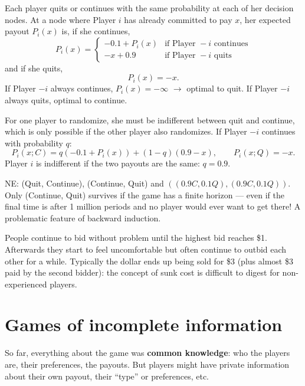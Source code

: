 \documentclass[11pt,a4paper,openany]{book}
\begin{document}
\begin{propbox}[title=Stationary strategies]
Each player quits or continues with the same probability at each of her decision nodes. At a
node where Player $i$ has already committed to pay $x$, her expected payout $P_i(x)$ is,
if she continues,
\[
P_i(x) =
\begin{cases}
-0.1 + P_i(x) & \text{if Player } -i \text{ continues} \\
-x + 0.9 & \text{if Player } -i \text{ quits}
\end{cases}
\]
and if she quits,
\[
P_i(x) = -x.
\]
If Player $-i$ always continues, $P_i(x) = -\infty$ $\rightarrow$ optimal to quit. If Player
$-i$ always quits, optimal to continue.
\end{propbox}


\begin{propbox}[title=Mixed strategies]
For one player to randomize, she must be indifferent between quit and continue, which is only
possible if the other player also randomizes. If Player $-i$ continues with probability $q$:
\[
P_i(x; C) = q(-0.1 + P_i(x)) + (1-q)(0.9 - x), \qquad P_i(x; Q) = -x.
\]
Player $i$ is indifferent if the two payouts are the same: $q = 0.9$.
\end{propbox}

\begin{keybox}[title={Three NE, one survives the finite horizon}]
NE: (Quit, Continue), (Continue, Quit) and $((0.9C, 0.1Q), (0.9C, 0.1Q))$. Only
(Continue, Quit) survives if the game has a finite horizon --- even if the final time is after
1 million periods and no player would ever want to get there! A problematic feature of
backward induction.
\end{keybox}

\begin{exbox}[title=In the lab]
People continue to bid without problem until the highest bid reaches \$1. Afterwards they
start to feel uncomfortable but often continue to outbid each other for a while. Typically
the dollar ends up being sold for \$3 (plus almost \$3 paid by the second bidder): the concept
of sunk cost is difficult to digest for non-experienced players.
\end{exbox}


\section{Games of incomplete information}

\begin{rembox}[title=Beyond common knowledge]
So far, everything about the game was \textbf{common knowledge}: who the players are, their
preferences, the payouts. But players might have private information about their own payout,
their ``type'' or preferences, etc.
\end{rembox}
\end{document}
